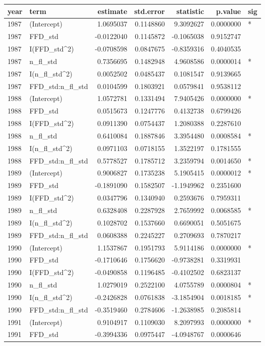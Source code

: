 \documentclass[]{article}
\newenvironment{Shaded}{\begin{snugshade}}{\end{snugshade}}
\newcommand{\KeywordTok}[1]{\textcolor[rgb]{0.13,0.29,0.53}{\textbf{#1}}}
\newcommand{\NormalTok}[1]{#1}
\begin{document}
\begin{Shaded}
\begin{Highlighting}[]
{{{{\KeywordTok{kable}\NormalTok{(sel_models3_coefs)  }
\end{Highlighting}
\end{Shaded}

\begin{longtable}[]{@{}llrrrrl@{}}
\toprule
year & term & estimate & std.error & statistic & p.value &
sig\tabularnewline
\midrule
\endhead
1987 & (Intercept) & 1.0695037 & 0.1148860 & 9.3092627 & 0.0000000 &
*\tabularnewline
1987 & FFD\_std & -0.0122040 & 0.1145872 & -0.1065038 & 0.9152747
&\tabularnewline
1987 & I(FFD\_std\^{}2) & -0.0708598 & 0.0847675 & -0.8359316 &
0.4040535 &\tabularnewline
1987 & n\_fl\_std & 0.7356695 & 0.1482948 & 4.9608586 & 0.0000014 &
*\tabularnewline
1987 & I(n\_fl\_std\^{}2) & 0.0052502 & 0.0485437 & 0.1081547 &
0.9139665 &\tabularnewline
1987 & FFD\_std:n\_fl\_std & 0.0104599 & 0.1803921 & 0.0579841 &
0.9538112 &\tabularnewline
1988 & (Intercept) & 1.0572781 & 0.1331494 & 7.9405426 & 0.0000000 &
*\tabularnewline
1988 & FFD\_std & 0.0515673 & 0.1247776 & 0.4132738 & 0.6799426
&\tabularnewline
1988 & I(FFD\_std\^{}2) & 0.0911390 & 0.0754437 & 1.2080388 & 0.2287610
&\tabularnewline
1988 & n\_fl\_std & 0.6410084 & 0.1887846 & 3.3954480 & 0.0008584 &
*\tabularnewline
1988 & I(n\_fl\_std\^{}2) & 0.0971103 & 0.0718155 & 1.3522197 &
0.1781555 &\tabularnewline
1988 & FFD\_std:n\_fl\_std & 0.5778527 & 0.1785712 & 3.2359794 &
0.0014650 & *\tabularnewline
1989 & (Intercept) & 0.9006827 & 0.1735238 & 5.1905415 & 0.0000012 &
*\tabularnewline
1989 & FFD\_std & -0.1891090 & 0.1582507 & -1.1949962 & 0.2351600
&\tabularnewline
1989 & I(FFD\_std\^{}2) & 0.0347796 & 0.1340940 & 0.2593676 & 0.7959311
&\tabularnewline
1989 & n\_fl\_std & 0.6328408 & 0.2287928 & 2.7659992 & 0.0068585 &
*\tabularnewline
1989 & I(n\_fl\_std\^{}2) & 0.1028702 & 0.1537660 & 0.6690051 &
0.5051675 &\tabularnewline
1989 & FFD\_std:n\_fl\_std & 0.0608388 & 0.2245227 & 0.2709693 &
0.7870217 &\tabularnewline
1990 & (Intercept) & 1.1537867 & 0.1951793 & 5.9114186 & 0.0000000 &
*\tabularnewline
1990 & FFD\_std & -0.1710646 & 0.1756620 & -0.9738281 & 0.3319931
&\tabularnewline
1990 & I(FFD\_std\^{}2) & -0.0490858 & 0.1196485 & -0.4102502 &
0.6823137 &\tabularnewline
1990 & n\_fl\_std & 1.0279019 & 0.2522100 & 4.0755789 & 0.0000804 &
*\tabularnewline
1990 & I(n\_fl\_std\^{}2) & -0.2426828 & 0.0761838 & -3.1854904 &
0.0018185 & *\tabularnewline
1990 & FFD\_std:n\_fl\_std & -0.3519460 & 0.2784606 & -1.2638985 &
0.2085814 &\tabularnewline
1991 & (Intercept) & 0.9104917 & 0.1109030 & 8.2097993 & 0.0000000 &
*\tabularnewline
1991 & FFD\_std & -0.3994336 & 0.0975447 & -4.0948767 & 0.0000646 &

\end{longtable}
\end{document}
